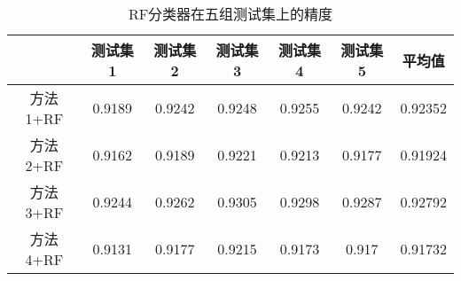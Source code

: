 \documentclass[lang=cn,11pt,a4paper,cite=authoryear]{elegantpaper}
\begin{document}
\begin{table}[htbp]
  \centering
  \caption{RF分类器在五组测试集上的精度}
    \begin{tabular}{|c|c|c|c|c|c|c|}
    \toprule
          & 测试集1  & 测试集2  & 测试集3  & 测试集4  & 测试集5  & 平均值 \\
    \midrule
    方法1+RF & 0.9189 & 0.9242 & 0.9248 & 0.9255 & 0.9242 & \cellcolor[rgb]{ 1,  0,  0}0.92352 \\
    \midrule
    方法2+RF & 0.9162 & 0.9189 & 0.9221 & 0.9213 & 0.9177 & \cellcolor[rgb]{ 1,  .486,  .502}0.91924 \\
    \midrule
    方法3+RF & 0.9244 & 0.9262 & 0.9305 & 0.9298 & 0.9287 & \cellcolor[rgb]{ .753,  0,  0}0.92792 \\
    \midrule
    方法4+RF & 0.9131 & 0.9177 & 0.9215 & 0.9173 & 0.917 & \cellcolor[rgb]{ 1,  .8,  .8}0.91732 \\
    \bottomrule
    \end{tabular}%
  \label{tab:table8}%
\end{table}%
\end{document}

